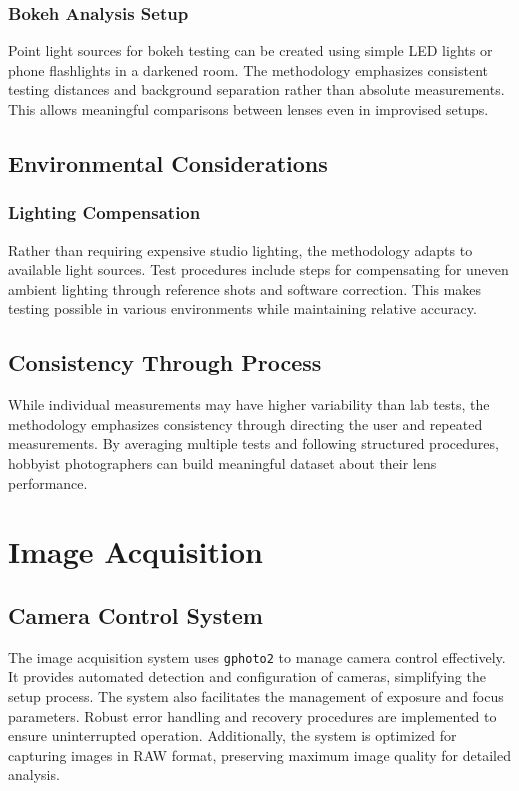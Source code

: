 \subsubsection{Bokeh Analysis Setup} 
Point light sources for bokeh testing can be created using simple LED lights or phone flashlights in a darkened room. The methodology emphasizes consistent testing distances and background separation rather than absolute measurements. This allows meaningful comparisons between lenses even in improvised setups.

\subsection{Environmental Considerations}

\subsubsection{Lighting Compensation}
Rather than requiring expensive studio lighting, the methodology adapts to available light sources. Test procedures include steps for compensating for uneven ambient lighting through reference shots and software correction. This makes testing possible in various environments while maintaining relative accuracy.

\subsection{Consistency Through Process}
While individual measurements may have higher variability than lab tests, the methodology emphasizes consistency through directing the user and repeated measurements. By averaging multiple tests and following structured procedures, hobbyist photographers can build meaningful dataset about their lens performance.

\section{Image Acquisition}

\subsection{Camera Control System}
The image acquisition system uses \texttt{gphoto2} to manage camera control effectively. It provides automated detection and configuration of cameras, simplifying the setup process. The system also facilitates the management of exposure and focus parameters. Robust error handling and recovery procedures are implemented to ensure uninterrupted operation. Additionally, the system is optimized for capturing images in RAW format, preserving maximum image quality for detailed analysis.


